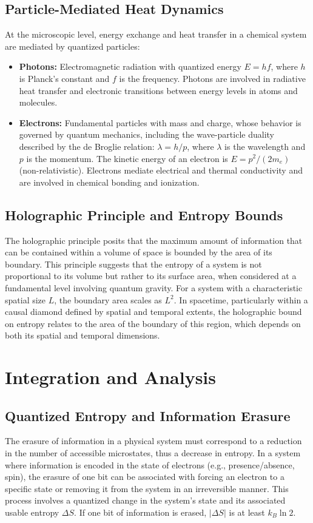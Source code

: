 		\subsection{Particle-Mediated Heat Dynamics}
		At the microscopic level, energy exchange and heat transfer in a chemical system are mediated by quantized particles:
		\begin{itemize}
			\item \textbf{Photons:} Electromagnetic radiation with quantized energy $E = h f$, where $h$ is Planck's constant and $f$ is the frequency. Photons are involved in radiative heat transfer and electronic transitions between energy levels in atoms and molecules.
			\item \textbf{Electrons:} Fundamental particles with mass and charge, whose behavior is governed by quantum mechanics, including the wave-particle duality described by the de Broglie relation: $\lambda = h/p$, where $\lambda$ is the wavelength and $p$ is the momentum. The kinetic energy of an electron is $E = p^2 / (2m_e)$ (non-relativistic). Electrons mediate electrical and thermal conductivity and are involved in chemical bonding and ionization.
		\end{itemize}
		
		\subsection{Holographic Principle and Entropy Bounds}
		The holographic principle posits that the maximum amount of information that can be contained within a volume of space is bounded by the area of its boundary. This principle suggests that the entropy of a system is not proportional to its volume but rather to its surface area, when considered at a fundamental level involving quantum gravity. For a system with a characteristic spatial size $L$, the boundary area scales as $L^2$. In spacetime, particularly within a causal diamond defined by spatial and temporal extents, the holographic bound on entropy relates to the area of the boundary of this region, which depends on both its spatial and temporal dimensions.
		
		\section{Integration and Analysis}
		
		\subsection{Quantized Entropy and Information Erasure}
		The erasure of information in a physical system must correspond to a reduction in the number of accessible microstates, thus a decrease in entropy. In a system where information is encoded in the state of electrons (e.g., presence/absence, spin), the erasure of one bit can be associated with forcing an electron to a specific state or removing it from the system in an irreversible manner. This process involves a quantized change in the system's state and its associated usable entropy $\Delta S$. If one bit of information is erased, $|\Delta S|$ is at least $k_B \ln 2$.
		
